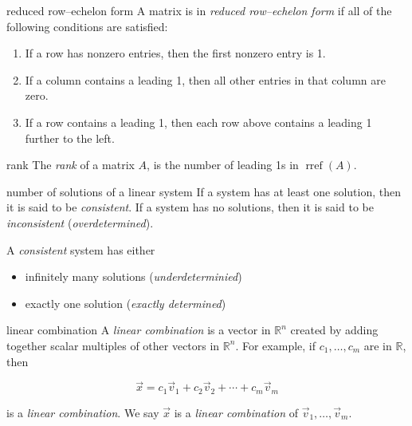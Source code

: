 \documentclass[avery5371,grid,letterpaper]{flashcards}
\newcommand{\R}{\mathbb{R}}
\newcommand{\Rn}{\mathbb{R}^{n}}
\DeclareMathOperator{\rref}{rref}
\begin{document}

\begin{flashcard}[Definition]{reduced row--echelon form}
A matrix is in \textit{reduced row--echelon form} if all of the
following conditions are satisfied:
\begin{enumerate}
\item If a row has nonzero entries, then the first nonzero entry is 1.
\item If a column contains a leading 1, then all other entries in that
column are zero.
\item If a row contains a leading 1, then each row above contains a
leading 1 further to the left.
\end{enumerate}
\end{flashcard}

\begin{flashcard}[Definition]{rank}
The \textit{rank} of a matrix $A$, is the number of leading 1s in $\rref(A)$.
\end{flashcard}

\begin{flashcard}{number of solutions of a linear system}
If a system has at least one solution, then it is said to be \textit{consistent}.
If a system has no solutions, then it is said to be \textit{inconsistent}
(\textit{overdetermined}).

\bigskip
A \textit{consistent} system has either
\begin{itemize}
\item infinitely many solutions (\textit{underdeterminied})
\item exactly one solution (\textit{exactly determined})
\end{itemize}
\end{flashcard}

\begin{flashcard}[Definition]{linear combination}
A \textit{linear combination} is a vector in $\Rn$ created by adding
together scalar multiples of other vectors in $\Rn$.  For example,
if $c_1, \ldots, c_m$ are in $\R$, then

\begin{displaymath}
\vec{x} = c_1\vec{v}_1 + c_2\vec{v}_2 + \cdots + c_m\vec{v}_m
\end{displaymath}

is a \textit{linear combination}.  We say $\vec{x}$ is
a \textit{linear combination} of $\vec{v}_1, \ldots, \vec{v}_m$.
\end{flashcard}
\end{document}
